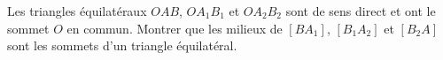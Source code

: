 Les triangles équilatéraux $OAB$, $OA_1B_1$ et $OA_2B_2$ sont de sens direct et ont le sommet $O$ en commun. Montrer que les milieux de $[BA_1]$, $[B_1A_2]$ et $[B_2A]$ sont les sommets d'un triangle équilatéral.
